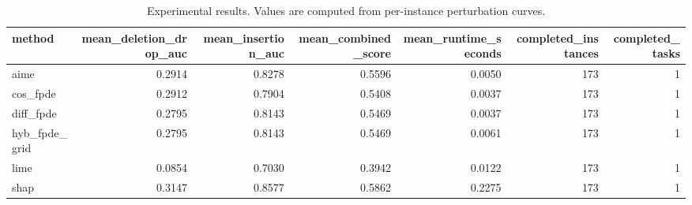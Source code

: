 \begin{table}[t]
\caption{Experimental results. Values are computed from per-instance perturbation curves.}
\label{tab:main_results_computed}
\centering
\begin{tabular}{lrrrrrr}
\toprule
method & mean\_deletion\_drop\_auc & mean\_insertion\_auc & mean\_combined\_score & mean\_runtime\_seconds & completed\_instances & completed\_tasks \\
\midrule
aime & 0.2914 & 0.8278 & 0.5596 & 0.0050 & 173 & 1 \\
cos\_fpde & 0.2912 & 0.7904 & 0.5408 & 0.0037 & 173 & 1 \\
diff\_fpde & 0.2795 & 0.8143 & 0.5469 & 0.0037 & 173 & 1 \\
hyb\_fpde\_grid & 0.2795 & 0.8143 & 0.5469 & 0.0061 & 173 & 1 \\
lime & 0.0854 & 0.7030 & 0.3942 & 0.0122 & 173 & 1 \\
shap & 0.3147 & 0.8577 & 0.5862 & 0.2275 & 173 & 1 \\
\bottomrule
\end{tabular}

\end{table}
